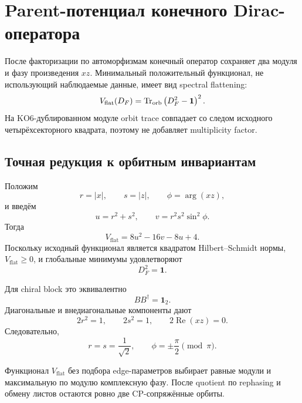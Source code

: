 \chapter{Parent-потенциал конечного Dirac-оператора}

После факторизации по автоморфизмам конечный оператор сохраняет два модуля
и фазу произведения \(xz\). Минимальный положительный функционал, не
использующий наблюдаемые данные, имеет вид spectral flattening:
\begin{equation}
 V_{\mathrm{flat}}(D_F)
 =\operatorname{Tr}_{\mathrm{orb}}\left(D_F^2-\mathbf1\right)^2.
\end{equation}
На KO6-дублированном модуле orbit trace совпадает со следом исходного
четырёхсекторного квадрата, поэтому не добавляет multiplicity factor.

\section{Точная редукция к орбитным инвариантам}

Положим
\begin{equation}
 r=|x|,
 \qquad
 s=|z|,
 \qquad
 \phi=\arg(xz),
\end{equation}
и введём
\begin{equation}
 u=r^2+s^2,
 \qquad
 v=r^2s^2\sin^2\phi.
\end{equation}
Тогда
\begin{equation}
 V_{\mathrm{flat}}
 =8u^2-16v-8u+4.
\end{equation}
Поскольку исходный функционал является квадратом Hilbert--Schmidt нормы,
\(V_{\mathrm{flat}}\ge0\), и глобальные минимумы удовлетворяют
\begin{equation}
 D_F^2=\mathbf1.
\end{equation}

Для chiral block это эквивалентно
\begin{equation}
 BB^\dagger=\mathbf1_2.
\end{equation}
Диагональные и внедиагональные компоненты дают
\begin{equation}
 2r^2=1,
 \qquad
 2s^2=1,
 \qquad
 2\operatorname{Re}(xz)=0.
\end{equation}
Следовательно,
\begin{equation}
 \boxed{
 r=s=\frac1{\sqrt2},
 \qquad
 \phi=\pm\frac{\pi}{2}\pmod{\pi}.}
\end{equation}

\begin{theorem}
Функционал \(V_{\mathrm{flat}}\) без подбора edge-параметров выбирает
равные модули и максимальную по модулю комплексную фазу. После quotient по
rephasing и обмену листов остаются ровно две CP-сопряжённые орбиты.
\end{theorem}


